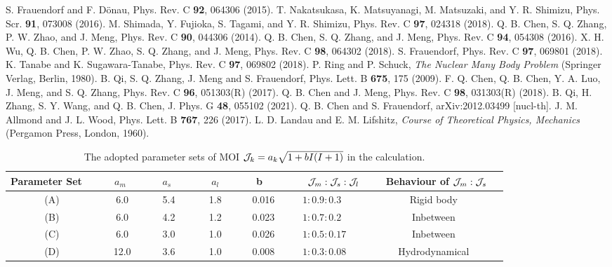 \documentclass[aps,prc,preprint,showpacs,groupedaddress,floatfix,amsmath,amssymb]{revtex4-1}
\begin{document}
\begin{thebibliography}{100}
S. Frauendorf and F. D\"{o}nau, Phys. Rev. C {\bf{92}}, 064306 (2015).
T. Nakatsukasa, K. Matsuyanagi, M. Matsuzaki, and Y. R. Shimizu, Phys. Scr. {\bf{91}}, 073008 (2016).
M. Shimada, Y. Fujioka, S. Tagami, and Y. R. Shimizu, Phys. Rev. C {\bf{97}}, 024318 (2018).
Q. B. Chen, S. Q. Zhang, P. W. Zhao, and J. Meng, Phys. Rev. C {\bf{90}}, 044306 (2014).
Q. B. Chen, S. Q. Zhang, and J. Meng, Phys. Rev. C {\bf{94}}, 054308 (2016).
X. H. Wu, Q. B. Chen, P. W. Zhao, S. Q. Zhang, and J. Meng, Phys. Rev. C {\bf{98}}, 064302 (2018).
S. Frauendorf, Phys. Rev. C {\bf{97}}, 069801 (2018).
K. Tanabe and K. Sugawara-Tanabe, Phys. Rev. C {\bf{97}}, 069802 (2018).
P. Ring and P. Schuck, \textit{The Nuclear Many Body Problem} (Springer Verlag, Berlin, 1980).
 B. Qi, S. Q. Zhang, J. Meng and S. Frauendorf, Phys. Lett. B {\bf 675}, 175 (2009).
F. Q. Chen, Q. B. Chen, Y. A. Luo, J. Meng, and S. Q. Zhang, Phys. Rev. C {\bf{96}}, 051303(R) (2017).
Q. B. Chen and J. Meng, Phys. Rev. C {\bf{98}}, 031303(R) (2018).
 B. Qi, H. Zhang, S. Y. Wang, and Q. B. Chen, J. Phys. G {\bf{48}}, 055102 (2021).
 Q. B. Chen and S. Frauendorf, arXiv:2012.03499 [nucl-th].
 J. M. Allmond and J. L. Wood, Phys. Lett. B {\bf 767}, 226 (2017).
 L. D. Landau and E. M. Lifshitz, \textit{Course of Theoretical Physics, Mechanics} (Pergamon Press, London, 1960).
\end{thebibliography}

\clearpage

\renewcommand{\thefootnote}{\alph{footnote}}
\begin{longtable}{ccccclc}
\caption{The adopted parameter sets of MOI ${\cal J}_{k}=a_{k}\sqrt{1+bI(I+1)}$ in the calculation.}
\label{tab:Pd105MOIset} \\
\hline
\hline
Parameter Set~~ & ~~${a}_m$ ~~& ~~${a}_s$ ~~&~~ ${a}_l$ ~~ & b &~~~~${\cal J}_m:{\cal J}_s:{\cal J}_l$ & ~~~Behaviour
of ${\cal J}_m:{\cal J}_s$~~\\
\hline
(A) & 6.0 & 5.4 & 1.8 & ~ 0.016  &~~~ $1:0.9:0.3$ & Rigid body \\
(B) & 6.0 & 4.2 & 1.2 & ~ 0.023  &~~~ $1:0.7:0.2$  & Inbetween\\
(C) & 6.0 & 3.0 & 1.0 & ~ 0.026 &~~~ $1:0.5:0.17$ & Inbetween \\
(D) & 12.0 & 3.6 & 1.0 &~  0.008 &~~~ $1:0.3:0.08$ & Hydrodynamical\\
 \hline
\end{longtable}
\end{document}
